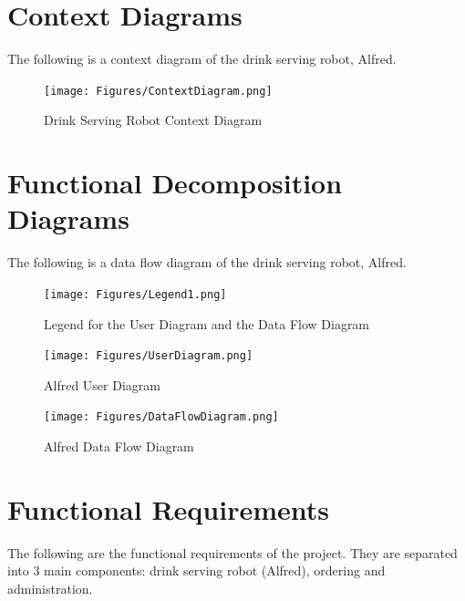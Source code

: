 \documentclass [11pt]{article}
\begin{document}


\pagebreak
\section{Context Diagrams}
The following is a context diagram of the drink serving robot, Alfred.
\begin{figure} [h!]
	\centering
	\texttt{[image: Figures/ContextDiagram.png]}
	\caption{Drink Serving Robot Context Diagram}
\end{figure}



\pagebreak
\section{Functional Decomposition Diagrams}
The following is a data flow diagram of the drink serving robot, Alfred.

\begin{figure} [h!]
	\centering
	\texttt{[image: Figures/Legend1.png]}
	\caption{Legend for the User Diagram and the Data Flow Diagram}
\end{figure}

\begin{figure} [h!]
	\centering
	\texttt{[image: Figures/UserDiagram.png]}
	\caption{Alfred User Diagram}
\end{figure}

\pagebreak
\begin{figure} [h!]
	\centering
	\texttt{[image: Figures/DataFlowDiagram.png]}
	\caption{Alfred Data Flow Diagram}
\end{figure}



\section {Functional Requirements} 
The following are the functional requirements of the project. They are separated into 3 main components: drink serving robot (Alfred), ordering and administration.
\end{document}
